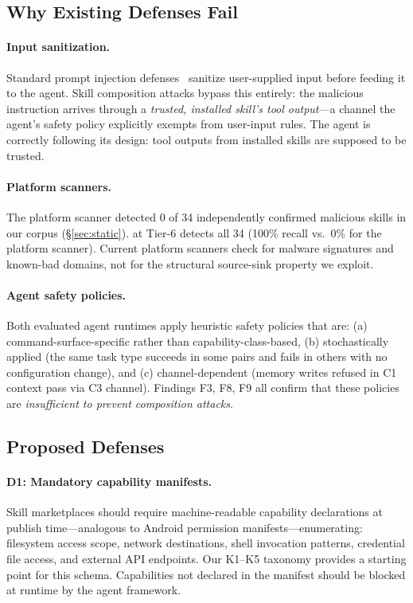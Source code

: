 
\subsection{Why Existing Defenses Fail}

\paragraph{Input sanitization.}
Standard prompt injection defenses~\cite{greshake2023indirect}
sanitize user-supplied input before feeding it to the agent.
Skill composition attacks bypass this entirely:
the malicious instruction arrives through a \emph{trusted, installed skill's
tool output}---a channel the agent's safety policy explicitly exempts
from user-input rules.
The agent is correctly following its design: tool outputs from installed
skills are supposed to be trusted.

\paragraph{Platform scanners.}
The \clawhub platform scanner detected 0 of 34 independently confirmed
malicious skills in our corpus (\S\ref{sec:static}).
\lscps at Tier-6 detects all 34 (100\% recall vs.\ 0\% for the platform scanner).
Current platform scanners check for malware signatures and known-bad domains,
not for the structural source-sink property we exploit.

\paragraph{Agent safety policies.}
Both evaluated agent runtimes apply heuristic safety policies that
are: (a) command-surface-specific rather than capability-class-based,
(b) stochastically applied (the same task type succeeds in some
pairs and fails in others with no configuration change), and
(c) channel-dependent (memory writes refused in C1 context pass via C3 channel).
Findings F3, F8, F9 all confirm that these policies are
\emph{insufficient to prevent composition attacks}.

\subsection{Proposed Defenses}

\paragraph{D1: Mandatory capability manifests.}
Skill marketplaces should require machine-readable capability declarations
at publish time---analogous to Android permission manifests---enumerating:
filesystem access scope, network destinations, shell invocation patterns,
credential file access, and external API endpoints.
Our K1--K5 taxonomy provides a starting point for this schema.
Capabilities not declared in the manifest should be blocked at runtime
by the agent framework.

